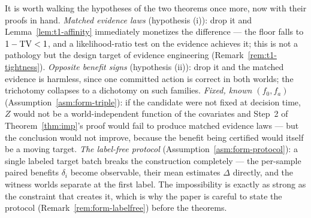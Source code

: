 \begin{remark}\label{rem:t1-necessity}
It is worth walking the hypotheses of the two theorems once more, now with
their proofs in hand. \emph{Matched evidence laws} (hypothesis (i)): drop
it and Lemma~\ref{lem:t1-affinity} immediately monetizes the difference
--- the floor falls to $1-\mathrm{TV}<1$, and a likelihood-ratio test on the
evidence achieves it; this is not a pathology but the design target of
evidence engineering (Remark~\ref{rem:t1-tightness}). \emph{Opposite
benefit signs} (hypothesis (ii)): drop it and the matched evidence is
harmless, since one committed action is correct in both worlds; the
trichotomy collapses to a dichotomy on such families. \emph{Fixed, known
$(f_0,f_a)$} (Assumption~\ref{asm:form-triple}): if the candidate were not
fixed at decision time, $Z$ would not be a world-independent function of
the covariates and Step~2 of Theorem~\ref{thm:imp}'s proof would fail to
produce matched evidence laws --- but the conclusion would not improve,
because the benefit being certified would itself be a moving target.
\emph{The label-free protocol} (Assumption~\ref{asm:form-protocol}): a
single labeled target batch breaks the construction completely --- the
per-sample paired benefits $\delta_i$ become observable, their mean
estimates $\Delta$ directly, and the witness worlds separate at the first
label. The impossibility is exactly as strong as the constraint that
creates it, which is why the paper is careful to state the protocol
(Remark~\ref{rem:form-labelfree}) before the theorems.
\end{remark}

